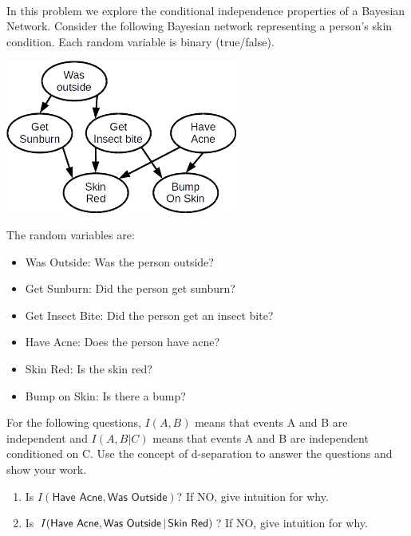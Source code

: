 \documentclass[submit]{harvardml}
\newcommand{\attr}[1]{\textsf{#1}}
\begin{document}
\begin{problem}
  ~

  \noindent In this problem we explore the conditional independence properties
  of a Bayesian Network.  Consider the following Bayesian network representing
  a person's skin condition. Each random variable is binary (true/false).

\begin{center}
\includegraphics[width=3in]{bn.png}
\end{center}

The random variables are:
%
\begin{itemize}
\item \attr{Was Outside}: Was the person outside?
\item \attr{Get Sunburn}: Did the person get sunburn?
\item \attr{Get Insect Bite}: Did the person get an insect bite?
\item \attr{Have Acne}: Does the person have acne?
\item \attr{Skin Red}: Is the skin red?
\item \attr{Bump on Skin}: Is there a bump?
\end{itemize}

\medskip

For the following questions, $I(A,B)$ means that events A and B are independent
and $I(A,B | C)$ means that events A and B are independent conditioned on C.
Use the concept of d-separation to answer the questions and show your work.


\begin{enumerate}
\item Is $I(\attr{Have Acne},\attr{Was Outside})$? If NO, give
intuition for why.


\item Is $I(\attr{Have Acne},\attr{Was Outside}\given \attr{Skin Red})$? If NO,
    give intuition for why.



\end{enumerate}
\end{problem}
\end{document}
